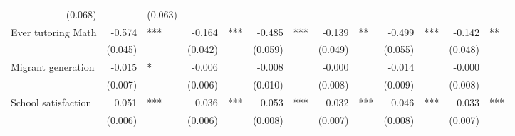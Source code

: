 \documentclass{article}
\begin{document}
\begin{table}[!h]
\begin{tabular}{lllllllllllll}
  \multicolumn{1}{r}{(0.068)} &
  \multicolumn{1}{l}{} &
  \multicolumn{1}{r}{(0.063)} &
  \multicolumn{1}{l}{} \\
\multicolumn{1}{l}{Ever tutoring Math} &
  \multicolumn{1}{r}{-0.574} &
  \multicolumn{1}{l}{***} &
  \multicolumn{1}{r}{-0.164} &
  \multicolumn{1}{l}{***} &
  \multicolumn{1}{r}{-0.485} &
  \multicolumn{1}{l}{***} &
  \multicolumn{1}{r}{-0.139} &
  \multicolumn{1}{l}{**} &
  \multicolumn{1}{r}{-0.499} &
  \multicolumn{1}{l}{***} &
  \multicolumn{1}{r}{-0.142} &
  \multicolumn{1}{l}{**} \\
\multicolumn{1}{l}{} &
  \multicolumn{1}{r}{(0.045)} &
  \multicolumn{1}{l}{} &
  \multicolumn{1}{r}{(0.042)} &
  \multicolumn{1}{l}{} &
  \multicolumn{1}{r}{(0.059)} &
  \multicolumn{1}{l}{} &
  \multicolumn{1}{r}{(0.049)} &
  \multicolumn{1}{l}{} &
  \multicolumn{1}{r}{(0.055)} &
  \multicolumn{1}{l}{} &
  \multicolumn{1}{r}{(0.048)} &
  \multicolumn{1}{l}{} \\
\multicolumn{1}{l}{Migrant generation} &
  \multicolumn{1}{r}{-0.015} &
  \multicolumn{1}{l}{*} &
  \multicolumn{1}{r}{-0.006} &
  \multicolumn{1}{l}{} &
  \multicolumn{1}{r}{-0.008} &
  \multicolumn{1}{l}{} &
  \multicolumn{1}{r}{-0.000} &
  \multicolumn{1}{l}{} &
  \multicolumn{1}{r}{-0.014} &
  \multicolumn{1}{l}{} &
  \multicolumn{1}{r}{-0.000} &
  \multicolumn{1}{l}{} \\
\multicolumn{1}{l}{} &
  \multicolumn{1}{r}{(0.007)} &
  \multicolumn{1}{l}{} &
  \multicolumn{1}{r}{(0.006)} &
  \multicolumn{1}{l}{} &
  \multicolumn{1}{r}{(0.010)} &
  \multicolumn{1}{l}{} &
  \multicolumn{1}{r}{(0.008)} &
  \multicolumn{1}{l}{} &
  \multicolumn{1}{r}{(0.009)} &
  \multicolumn{1}{l}{} &
  \multicolumn{1}{r}{(0.008)} &
  \multicolumn{1}{l}{} \\
\multicolumn{1}{l}{School satisfaction} &
  \multicolumn{1}{r}{0.051} &
  \multicolumn{1}{l}{***} &
  \multicolumn{1}{r}{0.036} &
  \multicolumn{1}{l}{***} &
  \multicolumn{1}{r}{0.053} &
  \multicolumn{1}{l}{***} &
  \multicolumn{1}{r}{0.032} &
  \multicolumn{1}{l}{***} &
  \multicolumn{1}{r}{0.046} &
  \multicolumn{1}{l}{***} &
  \multicolumn{1}{r}{0.033} &
  \multicolumn{1}{l}{***} \\
\multicolumn{1}{l}{} &
  \multicolumn{1}{r}{(0.006)} &
  \multicolumn{1}{l}{} &
  \multicolumn{1}{r}{(0.006)} &
  \multicolumn{1}{l}{} &
  \multicolumn{1}{r}{(0.008)} &
  \multicolumn{1}{l}{} &
  \multicolumn{1}{r}{(0.007)} &
  \multicolumn{1}{l}{} &
  \multicolumn{1}{r}{(0.008)} &
  \multicolumn{1}{l}{} &
  \multicolumn{1}{r}{(0.007)} &
  \multicolumn{1}{l}{} \\

\end{tabular}
\end{table}
\end{document}
